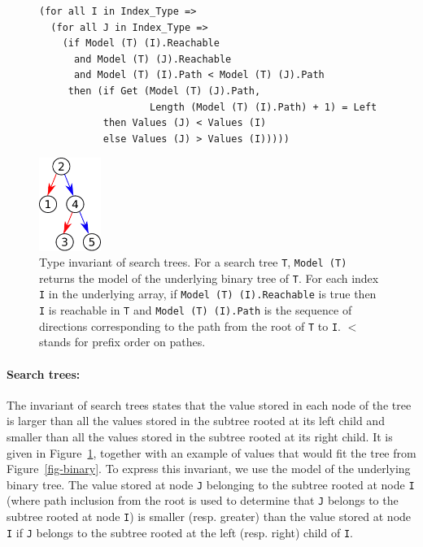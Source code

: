 \documentclass{llncs}
\begin{document}
\vspace{-1cm}
\begin{figure}[ht]
\hspace{-3mm}
\begin{minipage}[c]{.79\linewidth}
\begin{small}
\begin{lstlisting}
(for all I in Index_Type =>
  (for all J in Index_Type =>
    (if Model (T) (I).Reachable
      and Model (T) (J).Reachable
      and Model (T) (I).Path < Model (T) (J).Path
     then (if Get (Model (T) (J).Path,
                   Length (Model (T) (I).Path) + 1) = Left
           then Values (J) < Values (I)
           else Values (J) > Values (I)))))
\end{lstlisting}
\end{small}
\end{minipage}
\begin{minipage}[c]{.22\linewidth}
\begin{center}
\includegraphics[width=2cm]{search.pdf}
\end{center}
\end{minipage}
\caption{\label{fig-search} Type invariant of search trees. For a search tree \texttt{T},
\texttt{Model (T)} returns the model of the underlying binary tree of \texttt{T}.
For each index \texttt{I} in the underlying
array, if \texttt{Model (T) (I).Reachable} is true then \texttt{I} is reachable
in \texttt{T} and \texttt{Model (T) (I).Path} is the sequence
of directions corresponding to the path from the root of \texttt{T} to \texttt{I}.
$<$ stands for prefix order on pathes.}
\end{figure}

\paragraph{Search trees:}
The invariant of search trees states that the value stored in each node of the
tree is larger than all the values stored in the subtree rooted at its left
child and smaller than all the values stored in the subtree rooted at its right
child. It is given in Figure~\ref{fig-search}, together with an example of values that would
fit the tree from Figure~\ref{fig-binary}. To express this invariant, we use the model of the
underlying binary tree. The value stored at node \texttt{J} belonging to the subtree
rooted at node \texttt{I} (where path inclusion from the root is used to determine that
\texttt{J} belongs to the subtree rooted at node \texttt{I}) is smaller (resp. greater) than the
value stored at node \texttt{I} if \texttt{J} belongs to the subtree rooted at the left
(resp. right) child of \texttt{I}.
\end{document}
